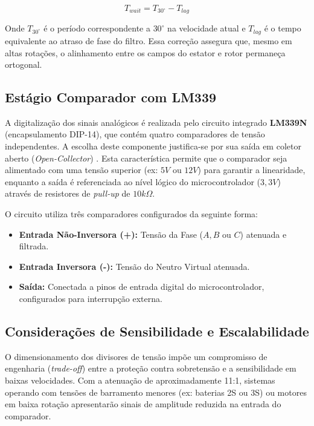 \begin{equation}
    T_{wait} = T_{30^{\circ}} - T_{lag}
\end{equation}

\noindent Onde $T_{30^{\circ}}$ é o período correspondente a $30^{\circ}$ na velocidade atual e $T_{lag}$ é o tempo equivalente ao atraso de fase do filtro. Essa correção assegura que, mesmo em altas rotações, o alinhamento entre os campos do estator e rotor permaneça ortogonal.

\subsection{Estágio Comparador com LM339}

A digitalização dos sinais analógicos é realizada pelo circuito integrado \textbf{LM339N} (encapsulamento DIP-14), que contém quatro comparadores de tensão independentes. A escolha deste componente justifica-se por sua saída em coletor aberto (\textit{Open-Collector}) \cite{tiLM339}. Esta característica permite que o comparador seja alimentado com uma tensão superior (ex: $5V$ ou $12V$) para garantir a linearidade, enquanto a saída é referenciada ao nível lógico do microcontrolador ($3,3V$) através de resistores de \textit{pull-up} de $10k\Omega$.

O circuito utiliza três comparadores configurados da seguinte forma:
\begin{itemize}
    \item \textbf{Entrada Não-Inversora (+):} Tensão da Fase ($A, B$ ou $C$) atenuada e filtrada.
    \item \textbf{Entrada Inversora (-):} Tensão do Neutro Virtual atenuada.
    \item \textbf{Saída:} Conectada a pinos de entrada digital do microcontrolador, configurados para interrupção externa.
\end{itemize}

\subsection{Considerações de Sensibilidade e Escalabilidade}

O dimensionamento dos divisores de tensão impõe um compromisso de engenharia (\textit{trade-off}) entre a proteção contra sobretensão e a sensibilidade em baixas velocidades. Com a atenuação de aproximadamente 11:1, sistemas operando com tensões de barramento menores (ex: baterias 2S ou 3S) ou motores em baixa rotação apresentarão sinais de amplitude reduzida na entrada do comparador.

